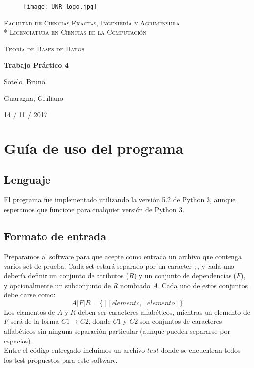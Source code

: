 \documentclass[a4paper]{report}
\begin{document}
\begin{titlepage}
\centering
\begin{figure}[H]
    \begin{center}
        \texttt{[image: UNR\_logo.jpg]}
    \end{center}
\end{figure}
{\scshape\large Facultad de Ciencias Exactas, Ingenier\'ia y Agrimensura\\*
                 Licenciatura en Ciencias de la Computaci\'on\par}
\vspace{5cm}
{\scshape\LARGE Teor\'ia de Bases de Datos \par}
{\huge\bfseries Trabajo Pr\'actico 4 \par}
\vspace{3cm}
{\Large Sotelo, Bruno\par}
{\Large Guaragna, Giuliano\par}
\vfill
{\large 14  / 11 / 2017 \par}
\end{titlepage}

\section*{Gu\'ia de uso del programa}
\subsection*{Lenguaje}
El programa fue implementado utilizando la versi\'on 5.2 de Python 3,
aunque esperamos que funcione para cualquier versi\'on de Python 3.

\subsection*{Formato de entrada}
Preparamos al software para que acepte como entrada un archivo que
contenga varios set de prueba. Cada set estar\'a separado por un
caracter $;$, y cada uno deber\'ia definir un conjunto de atributos ($R$) 
y un conjunto de dependencias ($F$), y opcionalmente un subconjunto de $R$
nombrado $A$. Cada uno de estos conjuntos debe darse como:
$$ A|F|R = \{[[elemento,] elemento]\} $$
Los elementos de $A$ y $R$ deben ser caracteres alfab\'eticos, mientras
un elemento de $F$ ser\'a de la forma $ C1 \to C2 $, donde $C1$ y $C2$
son conjuntos de caracteres alfab\'eticos sin ninguna separaci\'on
particular (aunque pueden separarse por espacios). \\
Entre el c\'odigo entregado incluimos un archivo $test$ donde se
encuentran todos los test propuestos para este software.
\end{document}
